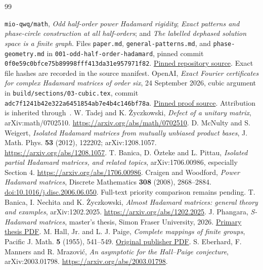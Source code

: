\begin{thebibliography}{99}
\raggedright
{} \texttt{mio-qwq/math}, \emph{Odd half-order power Hadamard rigidity}; \emph{Exact patterns and phase-circle construction at all half-orders}; and \emph{The labelled dephased solution space is a finite graph}. Files \texttt{paper.md}, \texttt{general-patterns.md}, and \texttt{phase-geometry.md} in \texttt{001-odd-half-order-hadamard}, pinned commit \texttt{0f0e59c0bfce75b89998fff413da31e957971f82}. \href{https://github.com/mio-qwq/math/tree/0f0e59c0bfce75b89998fff413da31e957971f82}{Pinned repository source}. Exact file hashes are recorded in the source manifest.
 OpenAI, \emph{Exact Fourier certificates for complex Hadamard matrices of order six}, 24 September 2026, cubic argument in \texttt{build/sections/03-cubic.tex}, commit \texttt{adc7f1241b42e322a6451854ab7e4b4c146bf78a}. \href{https://github.com/openai/math/blob/adc7f1241b42e322a6451854ab7e4b4c146bf78a/preprints/Exact-Fourier-certificates-for-complex-Hadamard-matrices-of-order-six-September-24-2026/build/sections/03-cubic.tex}{Pinned proof source}. Attribution is inherited through~\cite{mio}.
 W. Tadej and K. \.{Z}yczkowski, \emph{Defect of a unitary matrix}, arXiv:math/0702510. \url{https://arxiv.org/abs/math/0702510}.
 D. McNulty and S. Weigert, \emph{Isolated Hadamard matrices from mutually unbiased product bases}, J. Math. Phys. \textbf{53} (2012), 122202; arXiv:1208.1057. \url{https://arxiv.org/abs/1208.1057}.
 T. Banica, D. \"{O}zteke and L. Pittau, \emph{Isolated partial Hadamard matrices, and related topics}, arXiv:1706.00986, especially Section 4. \url{https://arxiv.org/abs/1706.00986}.
 Craigen and Woodford, \emph{Power Hadamard matrices}, Discrete Mathematics \textbf{308} (2008), 2868--2884. \href{https://doi.org/10.1016/j.disc.2006.06.050}{doi:10.1016/j.disc.2006.06.050}. Full-text priority comparison remains pending.
 T. Banica, I. Nechita and K. \.{Z}yczkowski, \emph{Almost Hadamard matrices: general theory and examples}, arXiv:1202.2025. \url{https://arxiv.org/abs/1202.2025}.
 J. Phangara, \emph{S-Hadamard matrices}, master's thesis, Simon Fraser University, 2026. \href{https://theses.lib.sfu.ca/file/thesis/etd24287-jasleen-phangara-mscthesisjasleenphan.pdf}{Primary thesis PDF}.
 M. Hall, Jr. and L. J. Paige, \emph{Complete mappings of finite groups}, Pacific J. Math. \textbf{5} (1955), 541--549. \href{https://msp.org/pjm/1955/5-4/pjm-v5-n4-p07-s.pdf}{Original publisher PDF}.
 S. Eberhard, F. Manners and R. Mrazovi\'{c}, \emph{An asymptotic for the Hall--Paige conjecture}, arXiv:2003.01798. \url{https://arxiv.org/abs/2003.01798}.
\end{thebibliography}
